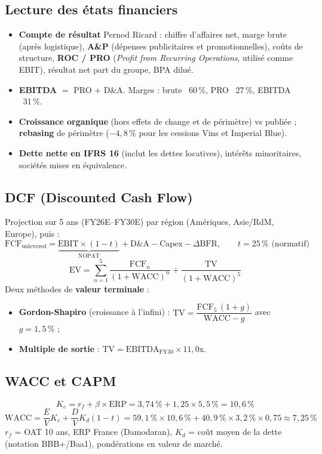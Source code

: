 \documentclass[11pt,a4paper]{article}
\begin{document}
\subsection{Lecture des états financiers}
\begin{itemize}
  \item \textbf{Compte de résultat} Pernod Ricard : chiffre d'affaires net, marge brute (après
        logistique), \textbf{A\&P} (dépenses publicitaires et promotionnelles), coûts de
        structure, \textbf{ROC / PRO} (\emph{Profit from Recurring Operations}, utilisé comme
        EBIT), résultat net part du groupe, BPA dilué.
  \item \textbf{EBITDA} $=$ PRO $+$ D\&A. Marges : brute ~60\,\%, PRO ~27\,\%, EBITDA ~31\,\%.
  \item \textbf{Croissance organique} (hors effets de change et de périmètre) vs publiée ;
        \textbf{rebasing} de périmètre ($-4{,}8\,\%$ pour les cessions Vins et Imperial Blue).
  \item \textbf{Dette nette en IFRS 16} (inclut les dettes locatives), intérêts minoritaires,
        sociétés mises en équivalence.
\end{itemize}

\subsection{DCF (Discounted Cash Flow)}
Projection sur 5 ans (FY26E–FY30E) par région (Amériques, Asie/RdM, Europe), puis :
\[
\text{FCF}_{\text{unlevered}} = \underbrace{\text{EBIT}\times(1-t)}_{\text{NOPAT}} + \text{D\&A} - \text{Capex} - \Delta\text{BFR},
\qquad t = 25\,\% \text{ (normatif)}
\]
\[
\text{EV} = \sum_{n=1}^{5}\frac{\text{FCF}_n}{(1+\text{WACC})^n} + \frac{\text{TV}}{(1+\text{WACC})^5}
\]
Deux méthodes de \textbf{valeur terminale} :
\begin{itemize}
  \item \textbf{Gordon-Shapiro} (croissance à l'infini) :
        $\text{TV} = \dfrac{\text{FCF}_{5}\,(1+g)}{\text{WACC}-g}$ avec $g = 1{,}5\,\%$ ;
  \item \textbf{Multiple de sortie} : $\text{TV} = \text{EBITDA}_{\text{FY30}} \times 11{,}0\text{x}$.
\end{itemize}

\subsection{WACC et CAPM}
\[
K_e = r_f + \beta \times \text{ERP} = 3{,}74\,\% + 1{,}25\times 5{,}5\,\% = 10{,}6\,\%
\]
\[
\text{WACC} = \frac{E}{V}K_e + \frac{D}{V}K_d(1-t) = 59{,}1\,\%\times10{,}6\,\% + 40{,}9\,\%\times 3{,}2\,\%\times 0{,}75 \approx 7{,}25\,\%
\]
$r_f$ = OAT 10 ans, ERP France (Damodaran), $K_d$ = coût moyen de la dette (notation BBB+/Baa1),
pondérations en valeur de marché.
\end{document}
